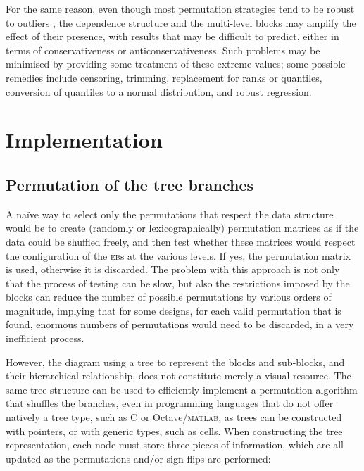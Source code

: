 For the same reason, even though most permutation strategies tend to be robust to outliers \citep{Anderson1999}, the dependence structure and the multi-level blocks may amplify the effect of their presence, with results that may be difficult to predict, either in terms of conservativeness or anticonservativeness. Such problems may be minimised by providing some treatment of these extreme values; some possible remedies include censoring, trimming, replacement for ranks or quantiles, conversion of quantiles to a normal distribution, and robust regression.

\section{Implementation}
\label{sec:ptree:implementation}

\subsection{Permutation of the tree branches}

A na\"{i}ve way to select only the permutations that respect the data structure would be to create (randomly or lexicographically) permutation matrices as if the data could be shuffled freely, and then test whether these matrices would respect the configuration of the \textsc{eb}s at the various levels. If yes, the permutation matrix is used, otherwise it is discarded. The problem with this approach is not only that the process of testing can be slow, but also the restrictions imposed by the blocks can reduce the number of possible permutations by various orders of magnitude, implying that for some designs, for each valid permutation that is found, enormous numbers of permutations would need to be discarded, in a very inefficient process.

However, the diagram using a tree to represent the blocks and sub-blocks, and their hierarchical relationship, does not constitute merely a visual resource. The same tree structure can be used to efficiently implement a permutation algorithm that shuffles the branches, even in programming languages that do not offer natively a tree type, such as C or Octave/\textsc{matlab}, as trees can be constructed with pointers, or with generic types, such as cells. When constructing the tree representation, each node must store three pieces of information, which are all updated as the permutations and/or sign flips are performed:

